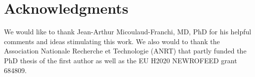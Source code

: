 
\section*{Acknowledgments}

We would like to thank Jean-Arthur Micoulaud-Franchi, MD, PhD for his helpful 
comments and ideas stimulating this work. We also would to thank the Association Nationale 
Recherche et Technologie (ANRT) that partly funded the PhD thesis of the first author as well as the EU 
H2020 NEWROFEED grant 684809.

